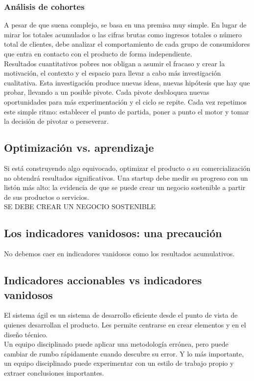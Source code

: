 \documentclass[10pt]{article}
\begin{document}
\begin{multicols}{2}
\subsubsection*{Análisis de cohortes}
A pesar de que suena complejo, se basa en una premisa muy simple. En lugar de mirar los totales acumulados o las cifras brutas como ingresos totales o número total de clientes, debe analizar el comportamiento de cada grupo de consumidores que entra en contacto con el producto de forma independiente.\\
Resultados cuantitativos pobres nos obligan a asumir el fracaso y crear la motivación, el contexto y el espacio para llevar a cabo más investigación cualitativa. Esta investigación produce nuevas ideas, nuevas hipótesis que hay que probar, llevando a un posible pivote. Cada pivote desbloquea nuevas oportunidades para más experimentación y el ciclo se repite. Cada vez repetimos este simple ritmo: establecer el punto de partida, poner a punto el motor y tomar la decisión de pivotar o perseverar.
\subsection*{Optimización vs. aprendizaje}
Si está construyendo algo equivocado, optimizar el producto o su comercialización no obtendrá resultados significativos. Una startup debe medir su progreso con un listón más alto: la evidencia de que se puede crear un negocio sostenible a partir de sus productos o servicios. \\
{\color{blue} SE DEBE CREAR UN NEGOCIO SOSTENIBLE}
\subsection*{Los indicadores vanidosos: una precaución}
No debemos caer en indicadores vanidosos como los resultados acumulativos.
\subsection*{Indicadores accionables vs indicadores vanidosos}
 El sistema ágil es un sistema de desarrollo eficiente desde el punto de vista de quienes desarrollan el producto. Les permite centrarse en crear elementos y en el diseño técnico. \\
{\color{blue}Un equipo disciplinado puede aplicar una metodología errónea, pero puede cambiar de rumbo rápidamente cuando descubre su error. Y lo más importante, un equipo disciplinado puede experimentar con un estilo de trabajo propio y extraer conclusiones importantes.
} 

\end{multicols}
\end{document}
